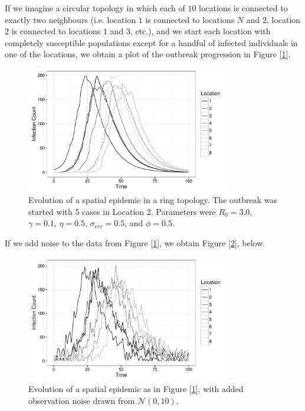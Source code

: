 	If we imagine a circular topology in which each of $10$ locations is connected to exactly two neighbours (i.e. location $1$ is connected to locations $N$ and $2$, location $2$ is connected to locations $1$ and $3$, etc.), and we start each location with completely susceptible populations except for a handful of infected individuals in one of the locations, we obtain a plot of the outbreak progression in Figure [\ref{dataplot}].

	\begin{figure}[H]
        \centering
        \captionsetup{width=.8\linewidth}
        \includegraphics[width=0.8\textwidth]{./images/dataplot.pdf}
        \caption{Evolution of a spatial epidemic in a ring topology. The outbreak was started with 5 cases in Location 2. Parameters were $R_0 = 3.0$, $\gamma = 0.1$, $\eta = 0.5$, $\sigma_{err} = 0.5$, and $\phi = 0.5$.}
        \label{dataplot}
    \end{figure}

    If we add noise to the data from Figure [\ref{dataplot}], we obtain Figure [\ref{dataplot2}], below.

    \begin{figure}[H]
        \centering
        \captionsetup{width=.8\linewidth}
        \includegraphics[width=0.8\textwidth]{./images/dataplot2.pdf}
        \caption{Evolution of a spatial epidemic as in Figure [\ref{dataplot}], with added observation noise drawn from $\mathcal{N}(0,10)$.}
        \label{dataplot2}
    \end{figure}


